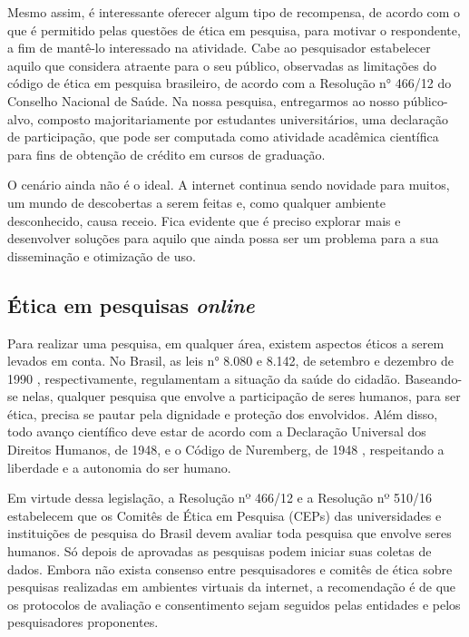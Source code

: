 \documentclass{textolivre}
\begin{document}
Mesmo assim, é interessante oferecer algum tipo de recompensa, de acordo com o que é permitido pelas questões de ética em pesquisa, para motivar o respondente, a fim de mantê-lo interessado na atividade. Cabe ao pesquisador estabelecer aquilo que considera atraente para o seu público, observadas as limitações do código de ética em pesquisa brasileiro, de acordo com a Resolução n° 466/12 do Conselho Nacional de Saúde. Na nossa pesquisa, entregarmos ao nosso público-alvo, composto majoritariamente por estudantes universitários, uma declaração de participação, que pode ser computada como atividade acadêmica científica para fins de obtenção de crédito em cursos de graduação.

O cenário ainda não é o ideal. A internet continua sendo novidade para muitos, um mundo de descobertas a serem feitas e, como qualquer ambiente desconhecido, causa receio. Fica evidente que é preciso explorar mais e desenvolver soluções para aquilo que ainda possa ser um problema para a sua disseminação e otimização de uso.

\subsection{Ética em pesquisas \textit{online}}
Para realizar uma pesquisa, em qualquer área, existem aspectos éticos a serem levados em conta. No Brasil, as leis n° 8.080 e 8.142, de setembro e dezembro de 1990 \cite{conselho2012}, respectivamente, regulamentam a situação da saúde do cidadão. Baseando-se nelas, qualquer pesquisa que envolve a participação de seres humanos, para ser ética, precisa se pautar pela dignidade e proteção dos envolvidos. Além disso, todo avanço científico deve estar de acordo com a Declaração Universal dos Direitos Humanos, de 1948, e o Código de Nuremberg, de 1948 \cite{conselho2012}, respeitando a liberdade e a autonomia do ser humano.

Em virtude dessa legislação, a Resolução nº 466/12 e a Resolução nº 510/16 \cite{universidade} estabelecem que os Comitês de Ética em Pesquisa (CEPs) das universidades e instituições de pesquisa do Brasil devem avaliar toda pesquisa que envolve seres humanos. Só depois de aprovadas as pesquisas podem iniciar suas coletas de dados. Embora não exista consenso entre pesquisadores e comitês de ética sobre pesquisas realizadas em ambientes virtuais da internet, a recomendação é de que os protocolos de avaliação e consentimento sejam seguidos pelas entidades e pelos pesquisadores proponentes.
\end{document}
